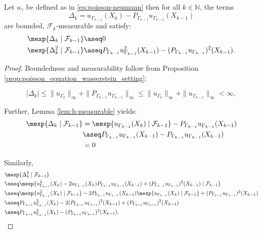 \begin{lemma}
\label{lemma:martingale}
Let $u_\gamma$ be defined as in \eqref{eq:poisson-neumann}
then for all $k \in \mathbb{N}$, the terms
\[
   \Delta_k = u_{\Gamma_{k-1}}(X_k) - P_{\Gamma_{k-1}}u_{\Gamma_{k-1}}(X_{k-1})
\]
are bounded, $\mathcal{F}_k$-measurable and satisfy:
\begin{align*}
      \mexp{ \Delta_k \mid \mathcal{F}_{k-1} } & \aseq  0 \\
      \mexp{ \Delta_k^2 \mid \mathcal{F}_{k-1}} & \aseq 
      P_{\Gamma_{k-1}} u_{\Gamma_{k-1}}^2 (X_{k-1}) - (P_{\Gamma_{k-1}} u_{\Gamma_{k-1}})^2(X_{k-1}).
\end{align*}
\end{lemma}
\begin{proof} 
Boundedness and measurability follow from 
Proposition \ref{prop:poisson_equation_wasserstein_setting}:

\[
|\Delta_k|\le \| u_{\Gamma_k} \|_\infty + \| P_{\Gamma_{k-1}}u_{\Gamma_{k-1}} \|_\infty 
   \le \| u_{\Gamma_k} \|_\infty + \| u_{\Gamma_{k-1}} \|_\infty < \infty,
\]

Further, Lemma \ref{lem:h-measurable} yields:
\begin{align*}
    \mexp{\Delta_k \mid \mathcal{F}_{k-1}} 
    &= \mexp{ u_{\Gamma_{k-1}}(X_k) \mid \mathcal{F}_{k-1}} - P_{\Gamma_{k-1}}u_{\Gamma_{k-1}}(X_{k-1}) \\
    & \aseq P_{\Gamma_{k-1}}u_{\Gamma_{k-1}}(X_{k-1}) - P_{\Gamma_{k-1}}u_{\Gamma_{k-1}}(X_{k-1}) \\ 
    &= 0
\end{align*}

Similarly, 
\begin{align*}
&\mexp{\Delta_k^2 \mid \mathcal{F}_{k-1}} \\
&\aseq \mexp{u_{\Gamma_{k-1}}^2(X_k) - 2u_{\Gamma_{k-1}}(X_k)P_{\Gamma_{k-1}}u_{\Gamma_{k-1}}(X_{k-1})+(P_{\Gamma_{k-1}}u_{\Gamma_{k-1}})^2(X_{k-1}) \mid \mathcal{F}_{k-1}} \\ 
&\aseq \mexp{u_{\Gamma_{k-1}}^2(X_k) \mid \mathcal{F}_{k-1}}- 2P_{\Gamma_{k-1}}u_{\Gamma_{k-1}}(X_{k-1})\mexp{u_{\Gamma_{k-1}}(X_k) \mid \mathcal{F}_{k-1}}+(P_{\Gamma_{k-1}}u_{\Gamma_{k-1}})^2(X_{k-1}) \\ 
&\aseq P_{\Gamma_{k-1}}u_{\Gamma_{k-1}}^2(X_k)- 2(P_{\Gamma_{k-1}}u_{\Gamma_{k-1}})^2(X_{k-1})+(P_{\Gamma_{k-1}}u_{\Gamma_{k-1}})^2(X_{k-1}) \\ 
&\aseq P_{\Gamma_{k-1}}u_{\Gamma_{k-1}}^2(X_k)-(P_{\Gamma_{k-1}}u_{\Gamma_{k-1}})^2(X_{k-1}). \qedhere
\end{align*}
\end{proof}

